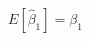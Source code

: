 \documentclass[border=1pt]{standalone}
\begin{document}
$\displaystyle E[\widehat{\beta}_1]=\beta_1$
\end{document}
